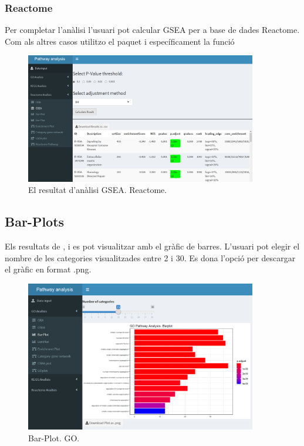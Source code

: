 \documentclass[]{article}
\begin{document}
\subsubsection{Reactome}
Per completar l'anàlisi l'usuari pot calcular GSEA per a base de dades Reactome. Com als altres casos utilitzo el paquet  i específicament la funció 

\begin{figure}[H]
\centering
\includegraphics[width=0.9\textwidth]{App_F13_Items_RA_GSEA.png}  
\caption{El resultat d'anàlisi GSEA. Reactome.}
\end{figure}

\subsection{Bar-Plots}
Els resultats de ,  i  es pot visualitzar amb el gràfic de barres. L'usuari pot elegir el nombre de les categories visualitzades entre 2 i 30. Es dona l'opció per descargar el gràfic en format .png.

\begin{figure}[H]
\centering
\includegraphics[width=0.9\textwidth]{App_F14_Items_GO_BarPlot.png}  
\caption{Bar-Plot. GO.}
\end{figure}
\end{document}
